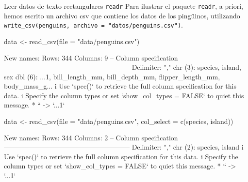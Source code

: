 \documentclass[
  ignorenonframetext,
  aspectratio=169]{beamer}
\newenvironment{Shaded}{\begin{snugshade}}{\end{snugshade}}
\newcommand{\AttributeTok}[1]{\textcolor[rgb]{0.77,0.63,0.00}{#1}}
\newcommand{\FunctionTok}[1]{\textcolor[rgb]{0.00,0.00,0.00}{#1}}
\newcommand{\NormalTok}[1]{#1}
\newcommand{\OtherTok}[1]{\textcolor[rgb]{0.56,0.35,0.01}{#1}}
\newcommand{\StringTok}[1]{\textcolor[rgb]{0.31,0.60,0.02}{#1}}
\let\oldverbatim\verbatim
\let\endoldverbatim\endverbatim
\renewenvironment{verbatim}{\tiny\oldverbatim}{\endoldverbatim}
\begin{document}
\begin{frame}[fragile]{Leer datos de texto rectangulares \texttt{readr}}
\protect\hypertarget{leer-datos-de-texto-rectangulares-readr-2}{}
Para ilustrar el paquete \texttt{readr}, a priori, hemos escrito un
archivo csv que contiene los datos de los pingüinos, utilizando
\texttt{write\_csv(penguins,\ archivo\ =\ "datos/penguins.csv")}.

\begin{Shaded}
\begin{Highlighting}[]
\NormalTok{data }\OtherTok{\textless{}{-}} \FunctionTok{read\_csv}\NormalTok{(}\AttributeTok{file =} \StringTok{"data/penguins.csv"}\NormalTok{)}
\end{Highlighting}
\end{Shaded}

\begin{verbatim}
New names:
Rows: 344 Columns: 9
-- Column specification
-------------------------------------------------------- Delimiter: "," chr
(3): species, island, sex dbl (6): ...1, bill_length_mm, bill_depth_mm,
flipper_length_mm, body_mass_g...
i Use `spec()` to retrieve the full column specification for this data. i
Specify the column types or set `show_col_types = FALSE` to quiet this message.
* `` -> `...1`
\end{verbatim}

\begin{Shaded}
\begin{Highlighting}[]
\NormalTok{data }\OtherTok{\textless{}{-}} \FunctionTok{read\_csv}\NormalTok{(}\AttributeTok{file =} \StringTok{"data/penguins.csv"}\NormalTok{, }\AttributeTok{col\_select =} \FunctionTok{c}\NormalTok{(species, island))}
\end{Highlighting}
\end{Shaded}

\begin{verbatim}
New names:
Rows: 344 Columns: 2
-- Column specification
-------------------------------------------------------- Delimiter: "," chr
(2): species, island
i Use `spec()` to retrieve the full column specification for this data. i
Specify the column types or set `show_col_types = FALSE` to quiet this message.
* `` -> `...1`
\end{verbatim}
\end{frame}
\end{document}
